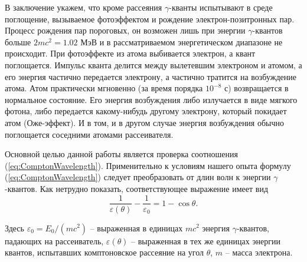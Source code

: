 \documentclass[a4paper,12pt]{article}
\begin{document}
\par

В заключение укажем, что кроме рассеяния $\gamma$-кванты испытывают в среде поглощение, вызываемое фотоэффектом и рождение электрон-позитронных пар. Процесс рождения пар пороговых, он возможен лишь при энергии $\gamma$-квантов больше $2mc^2=1.02$ МэВ и в рассматриваемом энергетическом диапазоне не происходит. При фотоэффекте из атома выбивается электрон, а квант поглощается. Импульс кванта делится между вылетевшим электроном и атомом, а его энергия частично передается электрону, а частично тратится на возбуждение атома. Атом практически мгновенно (за время порядка $10^{-8}$ с) возвращается в нормальное состояние. Его энергия возбуждения либо излучается в виде мягкого фотона, либо передается какому-нибудь другому электрону, который покидает атом (Оже-эффект). И в том, и в другом случае энергия возбуждения обычно поглощается соседними атомами рассеивателя.\par



Основной целью данной работы является проверка соотношения (\ref{eq:ComptonWavelength}). Применительно к условиям нашего опыта формулу (\ref{eq:ComptonWavelength}) следует преобразовать от длин волн к энергии $\gamma$-квантов. Как нетрудно показать, соответствующее выражение имеет вид
\begin{equation}
	\frac{1}{\varepsilon(\theta)}-\frac{1}{\varepsilon_0}=1-\cos\theta.
	\label{eq2}
\end{equation}
\par
Здесь $\varepsilon_0=E_0/\left(mc^2\right)$ -- выраженная в единицах $mc^2$ энергия $\gamma$-квантов, падающих на рассеиватель, $\varepsilon(\theta)$ -- выраженная в тех же единицах энергии квантов, испытавших комптоновское рассеяние на угол $\theta$, $m$ -- масса электрона.
\end{document}
